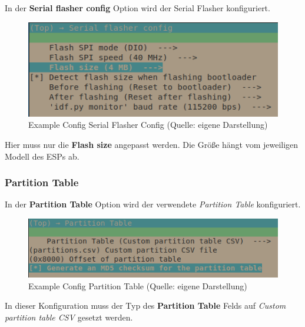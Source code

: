 In der \textbf{Serial flasher config} Option wird der Serial Flasher konfiguriert.

\begin{figure}[H]
    \begin{center}
        \includegraphics[scale=1]{images/example_config_serial_flasher_config.png}
        \caption{Example Config Serial Flasher Config (Quelle: eigene Darstellung)}
        \label{abb:example_config_serial_flasher_config}
    \end{center}
\end{figure}

Hier muss nur die \textbf{Flash size} angepasst werden. Die Größe hängt vom jeweiligen Modell des ESPs ab.

\subsubsection{Partition Table}\label{sec:example-partition-table}

In der \textbf{Partition Table} Option wird der verwendete \textit{Partition Table} konfiguriert.

\begin{figure}[H]
    \begin{center}
        \includegraphics[scale=1]{images/example_config_partition_table.png}
        \caption{Example Config Partition Table (Quelle: eigene Darstellung)}
        \label{abb:example_config_partition_table}
    \end{center}
\end{figure}

In dieser Konfiguration muss der Typ des \textbf{Partition Table} Felds auf \textit{Custom partition table CSV} gesetzt werden.

